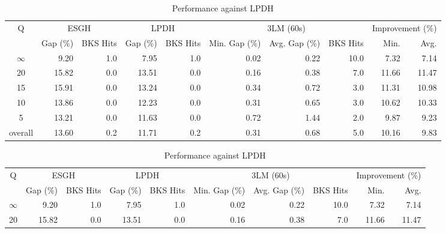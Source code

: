 \begin{table}[H]
\end{table}\begin{table}[H]
\centering
\caption{Performance against LPDH}
\label{tab:3lm_resuts_kritikos2}
\begin{tabular}{c rr rr rrr rr}
\toprule
       Q & \multicolumn{2}{c}{ESGH} & \multicolumn{2}{c}{LPDH} & \multicolumn{3}{c}{3LM (60s)} & \multicolumn{2}{c}{Improvement (\%)} \\
         & Gap (\%) & BKS Hits & Gap (\%) & BKS Hits & Min. Gap (\%) & Avg. Gap (\%) & BKS Hits &             Min. &  Avg. \\
\midrule
$\infty$ &     9.20 &      1.0 &     7.95 &      1.0 &          0.02 &          0.22 &     10.0 &             7.32 &  7.14 \\
      20 &    15.82 &      0.0 &    13.51 &      0.0 &          0.16 &          0.38 &      7.0 &            11.66 & 11.47 \\
      15 &    15.91 &      0.0 &    13.24 &      0.0 &          0.34 &          0.72 &      3.0 &            11.31 & 10.98 \\
      10 &    13.86 &      0.0 &    12.23 &      0.0 &          0.31 &          0.65 &      3.0 &            10.62 & 10.33 \\
       5 &    13.21 &      0.0 &    11.63 &      0.0 &          0.72 &          1.44 &      2.0 &             9.87 &  9.23 \\
\midrule
 overall &    13.60 &      0.2 &    11.71 &      0.2 &          0.31 &          0.68 &      5.0 &            10.16 &  9.83 \\
\bottomrule
\end{tabular}
\end{table}\begin{table}[H]
\centering
\caption{Performance against LPDH}
\label{tab:3lm_resuts_kritikos2}
\begin{tabular}{c rr rr rrr rr}
\toprule
       Q & \multicolumn{2}{c}{ESGH} & \multicolumn{2}{c}{LPDH} & \multicolumn{3}{c}{3LM (60s)} & \multicolumn{2}{c}{Improvement (\%)} \\
         & Gap (\%) & BKS Hits & Gap (\%) & BKS Hits & Min. Gap (\%) & Avg. Gap (\%) & BKS Hits &             Min. &  Avg. \\
\midrule
$\infty$ &     9.20 &      1.0 &     7.95 &      1.0 &          0.02 &          0.22 &     10.0 &             7.32 &  7.14 \\
      20 &    15.82 &      0.0 &    13.51 &      0.0 &          0.16 &          0.38 &      7.0 &            11.66 & 11.47 \\

\end{tabular}
\end{table}
